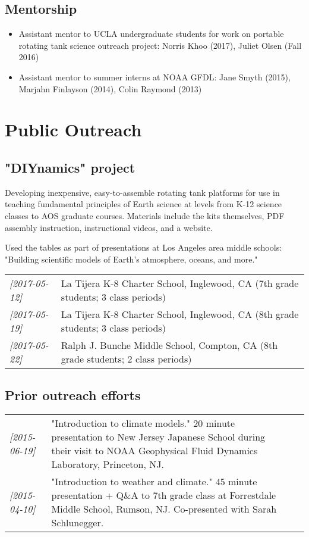 \documentclass[12pt,letterpaper]{shillcv}
\begin{document}
\subsection*{Mentorship}
\label{sec:org9e7560f}
\begin{itemize}
\item Assistant mentor to UCLA undergraduate students for work on portable rotating
tank science outreach project: Norris Khoo (2017), Juliet Olsen (Fall 2016)
\item Assistant mentor to summer interns at NOAA GFDL: Jane Smyth (2015), Marjahn
Finlayson (2014), Colin Raymond (2013)
\end{itemize}
\section*{Public Outreach}
\label{sec:orgb3a41ed}
\subsection*{"DIYnamics" project}
\label{sec:orgfa217a9}
Developing inexpensive, easy-to-assemble rotating tank platforms for use in
teaching fundamental principles of Earth science at levels from K-12 science
classes to AOS graduate courses.  Materials include the kits themselves, PDF
assembly instruction, instructional videos, and a website.

Used the tables as part of presentations at Los Angeles area middle schools:
"Building scientific models of Earth's atmosphere, oceans, and more."
\begin{center}
\begin{tabular}{ll}
\textit{[2017-05-12]} & La Tijera K-8 Charter School, Inglewood, CA (7th grade students; 3 class periods)\\
\textit{[2017-05-19]} & La Tijera K-8 Charter School, Inglewood, CA (8th grade students; 3 class periods)\\
\textit{[2017-05-22]} & Ralph J. Bunche Middle School, Compton, CA (8th grade students; 2 class periods)\\
\end{tabular}
\end{center}
\subsection*{Prior outreach efforts}
\label{sec:org171257f}
\begin{center}
\begin{tabularx}{\textwidth}{lX}
\textit{[2015-06-19]} & "Introduction to climate models."  20 minute presentation to New Jersey Japanese School during their visit to NOAA Geophysical Fluid Dynamics Laboratory, Princeton, NJ. &  &  & \\
\textit{[2015-04-10]} & "Introduction to weather and climate."  45 minute presentation + Q\&A to 7th grade class at Forrestdale Middle School, Rumson, NJ.  Co-presented with Sarah Schlunegger. &  &  & \\
\end{tabularx}
\end{center}
\end{document}
